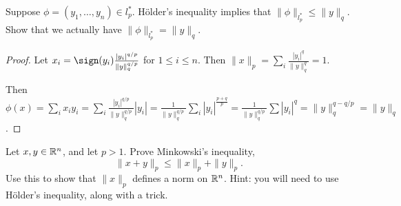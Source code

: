 \documentclass{article}
\begin{document}
 Suppose $\phi =(y_1, \ldots, y_n) \in l_p^*$. Hölder's inequality implies that $\|\phi\|_{l_p^*} \le \|y\|_q$. Show that we actually have $\|\phi\|_{l_p^*}  = \|y \|_q$.
\begin{proof}
Let $x_i = \sign(y_i) \frac {|y_i|^{q/p}}{\|y\|_q^{q/p}}$ for $1 \le i \le n$.  Then $\|x\|_p = \sum_i \frac {|y_i|^q} {\|y\|_q^q} = 1$.

Then $\phi(x) = \sum_i x_i y_i = \sum_i \frac {|y_i|^{q/p}}{\|y\|_q^{q/p}} |y_i| = \frac 1 {\|y\|_q^{q/p}} \sum_i |y_i|^{\frac {p + q} p }  = \frac 1 {\|y\|_q^{q/p}} \sum |y_i|^q = \|y\|_q^{q - q/p} = \|y\|_q$.

\end{proof}

 Let $x,y \in \mathbb{R}^n$, and let $p > 1$. Prove Minkowski's inequality, 
$$\|x + y \|_p \le \|x\|_p + \|y\|_p. $$
Use this to show that $\|x\|_p$ defines a norm on $\mathbb{R}^n$. Hint: you will need to use Hölder's inequality, along with a trick.
\end{document}
